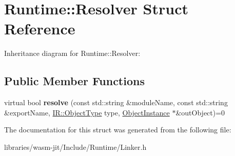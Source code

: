 \hypertarget{struct_runtime_1_1_resolver}{}\section{Runtime\+:\+:Resolver Struct Reference}
\label{struct_runtime_1_1_resolver}


Inheritance diagram for Runtime\+:\+:Resolver\+:
\subsection*{Public Member Functions}
\begin{DoxyCompactItemize}
\item 
\mbox{\label{struct_runtime_1_1_resolver_a8387253cf2addc917647cba230a00334}} 
virtual bool {\bfseries resolve} (const std\+::string \&module\+Name, const std\+::string \&export\+Name, \mbox{\hyperlink{struct_i_r_1_1_object_type}{I\+R\+::\+Object\+Type}} type, \mbox{\hyperlink{struct_runtime_1_1_object_instance}{Object\+Instance}} $\ast$\&out\+Object)=0
\end{DoxyCompactItemize}


The documentation for this struct was generated from the following file\+:\begin{DoxyCompactItemize}
\item 
libraries/wasm-\/jit/\+Include/\+Runtime/Linker.\+h\end{DoxyCompactItemize}
